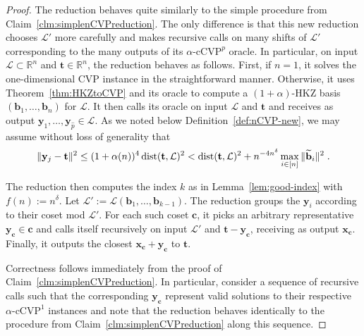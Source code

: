 \documentclass[11pt]{article}
\newcommand{\R}{\ensuremath{\mathbb{R}}}
\renewcommand{\vec}[1]{\ensuremath{\mathbf{#1}}}
\newcommand{\problem}[1]{\mbox{#1}\xspace}
\newcommand{\lat}{\mathcal{L}}
\newcommand{\gs}[1]{\ensuremath{\widetilde{#1}}}
\DeclareMathOperator{\dist}{dist}
\DeclarePairedDelimiter\length{\lVert}{\rVert}
\begin{document}
\begin{proof}
The reduction behaves quite similarly to the simple procedure from Claim~\ref{clm:simplenCVPreduction}. The only difference is that this new reduction chooses $\lat'$ more carefully and makes recursive calls on many shifts of $\lat'$ corresponding to the many outputs of its $\alpha\text{-}\problem{cCVP}^p$ oracle. In particular, on input $\lat \subset \R^n$ and $\vec{t} \in \R^n$, the reduction behaves as follows. First, if $n = 1$, it solves the one-dimensional CVP instance in the straightforward manner. Otherwise, it uses Theorem~\ref{thm:HKZtoCVP} and its oracle to compute a $(1+\alpha)$-HKZ basis $(\vec{b}_1, \ldots, \vec{b}_n)$ for $\lat$. It then calls its oracle on input $\lat$ and $\vec{t}$ and receives as output $\vec{y}_1,\ldots, \vec{y}_{\hat{p}} \in \lat$. As we noted below Definition~\ref{def:nCVP-new}, we may assume without loss of generality that
\begin{equation}
\label{eq:additivedistancebound}
\length{\vec{y}_j - \vec{t}}^2 
\leq (1+\alpha(n))^4 \dist(\vec{t}, \lat)^2 < \dist(\vec{t}, \lat)^2 + n^{-4n^\delta} \max_{i \in [n]} \|\gs{\vec{b}}_i\|^2 \; .
\end{equation}

The reduction then computes the index $k$ as in Lemma~\ref{lem:good-index} with $f(n) := n^\delta$. Let $\lat' := \lat(\vec{b}_1,\ldots, \vec{b}_{k-1})$. The reduction groups the $\vec{y}_i$ according to their coset mod $\lat'$. For each such coset $\vec{c}$, it picks an arbitrary representative $\vec{y}_{\vec{c}} \in \vec{c}$ and calls itself recursively on input $\lat'$ and $\vec{t} - \vec{y}_{\vec{c}}$, receiving as output $\vec{x}_{\vec{c}}$. Finally, it outputs the closest $\vec{x}_{\vec{c}} + \vec{y}_{\vec{c}}$ to $\vec{t}$.

Correctness follows immediately from the proof of Claim~\ref{clm:simplenCVPreduction}. In particular, consider a sequence of recursive calls such that the corresponding $\vec{y}_{\vec{c}}$ represent valid solutions to their respective $\alpha\text{-}\problem{cCVP}^1$ instances and note that the reduction behaves identically to the procedure from Claim~\ref{clm:simplenCVPreduction} along this sequence.


\end{proof}
\end{document}
